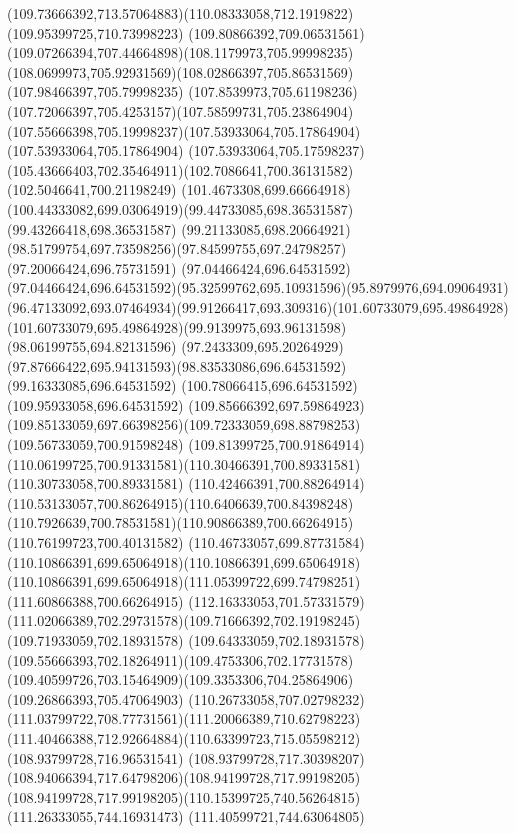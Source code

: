 {{\curveto(109.73666392,713.57064883)(110.08333058,712.1919822)(109.95399725,710.73998223)
\curveto(109.80866392,709.06531561)(109.07266394,707.44664898)(108.1179973,705.99998235)
\curveto(108.0699973,705.92931569)(108.02866397,705.86531569)(107.98466397,705.79998235)
\curveto(107.8539973,705.61198236)(107.72066397,705.4253157)(107.58599731,705.23864904)
\curveto(107.55666398,705.19998237)(107.53933064,705.17864904)(107.53933064,705.17864904)
\lineto(107.53933064,705.17598237)
\curveto(105.43666403,702.35464911)(102.7086641,700.36131582)(102.5046641,700.21198249)
\curveto(101.4673308,699.66664918)(100.44333082,699.03064919)(99.44733085,698.36531587)
\lineto(99.43266418,698.36531587)
\lineto(99.21133085,698.20664921)
\curveto(98.51799754,697.73598256)(97.84599755,697.24798257)(97.20066424,696.75731591)
\lineto(97.04466424,696.64531592)
\curveto(97.04466424,696.64531592)(95.32599762,695.10931596)(95.8979976,694.09064931)
\curveto(96.47133092,693.07464934)(99.91266417,693.309316)(101.60733079,695.49864928)
\curveto(101.60733079,695.49864928)(99.9139975,693.96131598)(98.06199755,694.82131596)
\curveto(97.2433309,695.20264929)(97.87666422,695.94131593)(98.83533086,696.64531592)
\lineto(99.16333085,696.64531592)
\lineto(100.78066415,696.64531592)
\lineto(109.95933058,696.64531592)
\lineto(109.85666392,697.59864923)
\curveto(109.85133059,697.66398256)(109.72333059,698.88798253)(109.56733059,700.91598248)
\curveto(109.81399725,700.91864914)(110.06199725,700.91331581)(110.30466391,700.89331581)
\lineto(110.30733058,700.89331581)
\curveto(110.42466391,700.88264914)(110.53133057,700.86264915)(110.6406639,700.84398248)
\curveto(110.7926639,700.78531581)(110.90866389,700.66264915)(110.76199723,700.40131582)
\curveto(110.46733057,699.87731584)(110.10866391,699.65064918)(110.10866391,699.65064918)
\curveto(110.10866391,699.65064918)(111.05399722,699.74798251)(111.60866388,700.66264915)
\curveto(112.16333053,701.57331579)(111.02066389,702.29731578)(109.71666392,702.19198245)
\lineto(109.71933059,702.18931578)
\curveto(109.64333059,702.18931578)(109.55666393,702.18264911)(109.4753306,702.17731578)
\curveto(109.40599726,703.15464909)(109.3353306,704.25864906)(109.26866393,705.47064903)
\curveto(110.26733058,707.02798232)(111.03799722,708.77731561)(111.20066389,710.62798223)
\curveto(111.40466388,712.92664884)(110.63399723,715.05598212)(108.93799728,716.96531541)
\curveto(108.93799728,717.30398207)(108.94066394,717.64798206)(108.94199728,717.99198205)
\curveto(108.94199728,717.99198205)(110.15399725,740.56264815)(111.26333055,744.16931473)
\lineto(111.40599721,744.63064805)
}}
